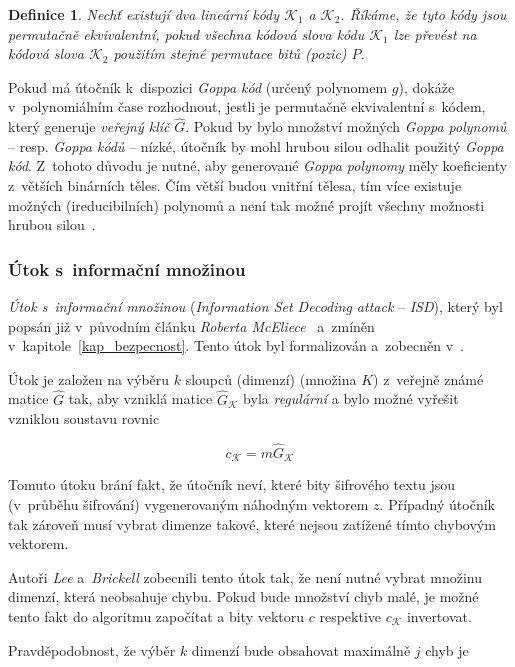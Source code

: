 \documentclass[thesis=M,czech,hidelinks]{FITthesis}[2012/06/26]
\newcommand{\0}{{\textcolor[gray]{0.80}{0}}}
\newtheorem{definice}{Definice}
\begin{document}
\begin{definice}
    Nechť existují dva lineární kódy $\mathcal{K}_1$ a $\mathcal{K}_2$. Říkáme,
    že tyto kódy jsou \emph{permutačně ekvivalentní}, pokud všechna kódová slova
    kódu $\mathcal{K}_1$ lze převést na kódová slova $\mathcal{K}_2$ použitím
    stejné permutace bitů (pozic) $P$.
\end{definice}

Pokud má útočník k~dispozici \emph{Goppa kód} (určený polynomem $g$), dokáže
v~polynomiálním čase rozhodnout, jestli je permutačně ekvivalentní s~kódem,
který generuje \emph{veřejný klíč} $\hat{G}$. Pokud by bylo množství možných
\emph{Goppa polynomů} -- resp. \emph{Goppa kódů} -- nízké, útočník by mohl
hrubou silou odhalit použitý \emph{Goppa kód}. Z~tohoto důvodu je nutné, aby
generované \emph{Goppa polynomy} měly koeficienty z~větších binárních těles. Čím
větší budou vnitřní tělesa, tím více existuje možných (ireducibilních) polynomů
a není tak možné projít všechny možnosti hrubou silou~\cite{Repka}.

\subsubsection{Útok s~informační množinou}

\emph{Útok s~informační množinou} (\emph{Information Set Decoding attack} --
\emph{ISD}), který byl popsán již v~původním článku \emph{Roberta
McEliece}~\cite{McEliece} a~zmíněn v~kapitole~\ref{kap_bezpecnost}. Tento útok
byl formalizován a~zobecněn v~\cite{Lee}.

Útok je založen na výběru $k$ sloupců (dimenzí) (množina $K$) z~veřejně známé
matice $\hat{G}$ tak, aby vzniklá matice $\hat{G}_{\mathcal{K}}$ byla
\emph{regulární} a bylo možné vyřešit vzniklou soustavu rovnic

$$ c_{\mathcal{K}} = m \hat{G}_{\mathcal{K}} $$

Tomuto útoku brání fakt, že útočník neví, které bity šifrového textu jsou
(v~průběhu šifrování)  vygenerovaným náhodným vektorem $z$.
Případný útočník tak zároveň musí vybrat dimenze takové, které nejsou zatížené
tímto chybovým vektorem.

Autoři \emph{Lee} a~\emph{Brickell} zobecnili tento útok tak, že není nutné
vybrat množinu dimenzí, která neobsahuje chybu. Pokud bude množství chyb malé,
je možné tento fakt do algoritmu započítat a bity vektoru $c$ respektive
$c_{\mathcal{K}}$ invertovat.

Pravděpodobnost, že výběr $k$ dimenzí bude obsahovat maximálně $j$ chyb je
\end{document}
